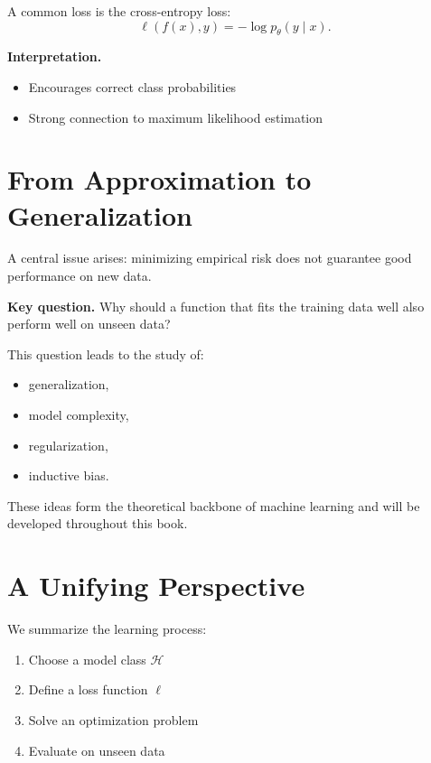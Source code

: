 A common loss is the cross-entropy loss:
\[
\ell(f(x), y) = -\log p_\theta(y \mid x).
\]

\medskip

\noindent
\textbf{Interpretation.}
\begin{itemize}
    \item Encourages correct class probabilities
    \item Strong connection to maximum likelihood estimation
\end{itemize}

\section{From Approximation to Generalization}

A central issue arises: minimizing empirical risk does not guarantee good performance on new data.

\medskip

\noindent
\textbf{Key question.}  
Why should a function that fits the training data well also perform well on unseen data?

\medskip

This question leads to the study of:
\begin{itemize}
    \item generalization,
    \item model complexity,
    \item regularization,
    \item inductive bias.
\end{itemize}

\medskip

These ideas form the theoretical backbone of machine learning and will be developed throughout this book.

\section{A Unifying Perspective}

We summarize the learning process:

\begin{enumerate}
    \item Choose a model class $\mathcal{H}$
    \item Define a loss function $\ell$
    \item Solve an optimization problem
    \item Evaluate on unseen data
\end{enumerate}

